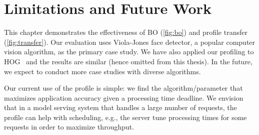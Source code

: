 \section{Limitations and Future Work}
\label{sec:limitations}

 This chapter demonstrates the effectiveness of BO
(\autoref{fig:bo}) and profile transfer (\autoref{fig:transfer}). Our evaluation
uses Viola-Jones face detector, a popular computer vision algorithm, as the
primary case study. We have also applied our profiling to
HOG~\cite{dalal2005histograms} and the results are similar (hence omitted from
this thesis). In the future, we expect to conduct more case studies with diverse
algorithms.

 Our current use of the profile is simple: we find the
algorithm/parameter that maximizes application accuracy given a processing time
deadline. We envision that in a model serving system that handles a large number
of requests, the profile can help with scheduling, e.g., the server tune
processing times for some requests in order to maximize throughput.

